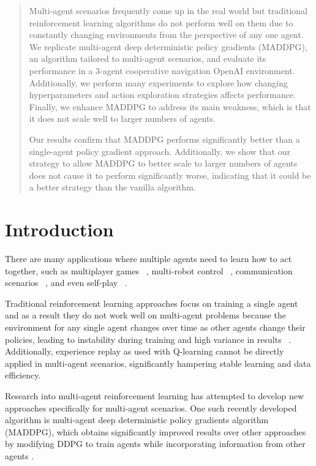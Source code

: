 \documentclass{article}
\begin{document}
\begin{abstract}
Multi-agent scenarios frequently come up in the real world but traditional reinforcement learning algorithms do not perform well on them due to constantly changing environments from the perspective of any one agent. We replicate multi-agent deep deterministic policy gradients (MADDPG), an algorithm tailored to multi-agent scenarios, and evaluate its performance in a 3-agent cooperative navigation OpenAI environment. Additionally, we perform many experiments to explore how changing hyperparameters and action exploration strategies affects performance. Finally, we enhance MADDPG to address its main weakness, which is that it does not scale well to larger numbers of agents.

Our results confirm that MADDPG performs significantly better than a single-agent policy gradient approach. Additionally, we show that our strategy to allow MADDPG to better scale to larger numbers of agents does not cause it to perform significantly worse, indicating that it could be a better strategy than the vanilla algorithm.
\end{abstract}


\section{Introduction}
\label{submission}

There are many applications where multiple agents need to learn how to act together, such as multiplayer games ~\cite{multigames}, multi-robot control ~\cite{multirobot}, communication scenarios ~\cite{communication}, and even self-play ~\cite{selfplay}.

Traditional reinforcement learning approaches focus on training a single agent and as a result they do not work well on multi-agent problems because the environment for any single agent changes over time as other agents change their policies, leading to instability during training and high variance in results ~\cite{unstable}. Additionally, experience replay as used with Q-learning cannot be directly applied in multi-agent scenarios, significantly hampering stable learning and data efficiency.

Research into multi-agent reinforcement learning has attempted to develop new approaches specifically for multi-agent scenarios. One such recently developed algorithm is multi-agent deep deterministic policy gradients algorithm (MADDPG), which obtains significantly improved results over other approaches by modifying DDPG to train agents while incorporating information from other agents \cite{maddpg}.
\end{document}

